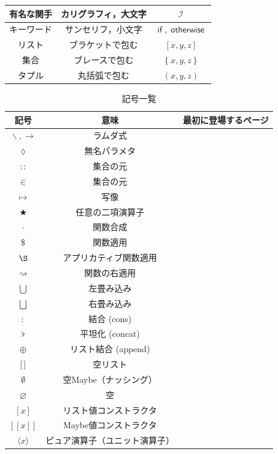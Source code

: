 \documentclass[a4paper]{jsbook}
\def\[{\left[\!\left[}
\def\]{\right]\!\right]}
\newcommand{\mSpecialFunctor}[1]{\mathcal{#1}} %
\newcommand{\mNothing}{\emptyset}
\newcommand{\mPureNothing}{\varnothing}
\newcommand{\mKeyword}[1]{\mathsf{#1}}
\newcommand{\mIfKeyword}{\mKeyword{if}}
\newcommand{\mOtherwiseKeyword}{\mKeyword{otherwise}}
\newcommand{\mListWith}[1]{\left[#1\right]}
\newcommand{\mSetWith}[1]{\left\{#1\right\}}
\newcommand{\mTupleWith}[1]{\left(#1\right)}
\newcommand{\mMaybeWith}[1]{\[#1\]}
\newcommand{\mPureWith}[1]{\langle#1\rangle}
\newcommand{\mAnonParameter}{\lozenge}
\DeclareMathOperator{\mLambda}{\backslash}
\DeclareMathOperator{\mLambdaArrow}{\rightarrow}
\DeclareMathOperator{\mIn}{{:\!:}}
\DeclareMathOperator{\mMapsTo}{\mapsto}
\DeclareMathOperator{\mBinOp}{\bigstar}
\DeclareMathOperator{\mComp}{\cdot}
\DeclareMathOperator{\mApply}{\$}
\DeclareMathOperator{\mApplyRight}{\rightsquigarrow}
\DeclareMathOperator*{\mFoldLeft}{\bigcup}
\DeclareMathOperator*{\mFoldRight}{\bigsqcup}
\DeclareMathOperator{\mCons}{:}
\DeclareMathOperator{\mConcat}{\flat}
\DeclareMathOperator{\mAppend}{\oplus}
\DeclareMathOperator{\mApplicativeApply}{\S}
\DeclareMathOperator{\mIFunctor}{\mSpecialFunctor{I}}
\DeclareMathOperator{\mIf}{\mIfKeyword}
\DeclareMathOperator{\mOtherwise}{\mOtherwiseKeyword}
\newcommand{\mathMaybeAppend}{\mathbin{\boxplus}}
\newcommand{\mathVarKeyword}[1]{\operatorname{\mathrm{#1}}}
\newcommand{\mathRest}{\mathVarKeyword{rest}}
\begin{document}
\begin{table}
\begin{center}
\begin{tabular}{||c|c|c||}
有名な関手&カリグラフィ，大文字&$\mIFunctor$\\
\hline
キーワード&サンセリフ，小文字&$\mIf,\mOtherwise$\\
\hline
リスト&ブラケットで包む&$\mListWith{x,y,z}$\\
集合&ブレースで包む&$\mSetWith{x,y,z}$\\
タプル&丸括弧で包む&$\mTupleWith{x,y,z}$\\
\hline
\end{tabular}
\end{center}
\end{table}

\begin{table}[p]
\caption{記号一覧}
\begin{center}
\begin{tabular}{||c|c|c||}
\hline
記号&意味&最初に登場するページ\\
\hline\hline
$\mLambda, \mLambdaArrow$&ラムダ式&\\
$\mAnonParameter$&無名パラメタ&\\
\hline
$\mIn$&集合の元&\\
$\in$&集合の元&\\
$\mMapsTo$&写像&\\\hline
$\mBinOp$&任意の二項演算子&\\
$\mComp$&関数合成&\\
$\mApply$&関数適用&\\
$\mApplicativeApply$&アプリカティブ関数適用&\\
$\mApplyRight$&関数の右適用&\\\hline
$\mFoldLeft$&左畳み込み&\\
$\mFoldRight$&右畳み込み&\\
\hline
$\mCons$&結合 (cons)&\\
$\mConcat$&平坦化 (concat)&\\
$\mAppend$&リスト結合 (append)&\\
\hline
${[\,]}$&空リスト&\\
$\mNothing$&空Maybe（ナッシング）&\\
$\mPureNothing$&空&\\\hline
$\mListWith{x}$&リスト値コンストラクタ&\\
$\mMaybeWith{x}$&Maybe値コンストラクタ&\\
$\mPureWith{x}$&ピュア演算子（ユニット演算子）&\\

\end{tabular}
\end{center}
\end{table}
\end{document}

